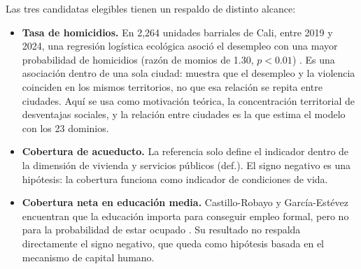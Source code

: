 Las tres candidatas elegibles tienen un respaldo de distinto alcance:
\begin{itemize}
    \item \textbf{Tasa de homicidios.} En 2,264 unidades barriales de Cali, entre 2019 y 2024, una regresión logística ecológica asoció el desempleo con una mayor probabilidad de homicidios (razón de momios de 1.30, $p < 0.01$) \cite{PinzonFlorez2025}. Es una asociación dentro de una sola ciudad: muestra que el desempleo y la violencia coinciden en los mismos territorios, no que esa relación se repita entre ciudades. Aquí se usa como motivación teórica, la concentración territorial de desventajas sociales, y la relación entre ciudades es la que estima el modelo con los 23 dominios.
    \item \textbf{Cobertura de acueducto.} La referencia solo define el indicador dentro de la dimensión de vivienda y servicios públicos (def.). El signo negativo es una hipótesis: la cobertura funciona como indicador de condiciones de vida.
    \item \textbf{Cobertura neta en educación media.} Castillo-Robayo y García-Estévez encuentran que la educación importa para conseguir empleo formal, pero no para la probabilidad de estar ocupado \cite{CastilloGarcia2019}. Su resultado no respalda directamente el signo negativo, que queda como hipótesis basada en el mecanismo de capital humano.
\end{itemize}

